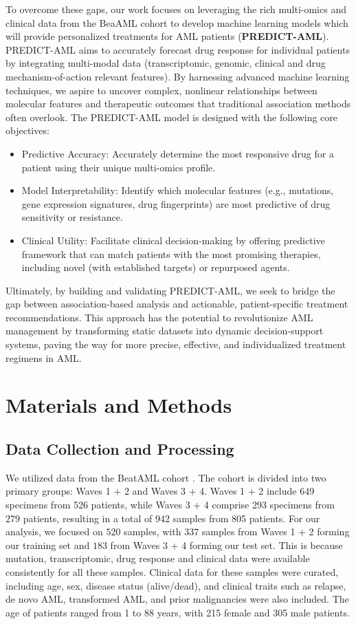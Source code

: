 \documentclass[pdflatex,sn-mathphys-num]{sn-jnl}%
\theoremstyle{thmstyleone}%
\theoremstyle{thmstyletwo}%
\theoremstyle{thmstylethree}%
\begin{document}
To overcome these gaps, our work focuses on leveraging the rich multi-omics and clinical data from the BeaAML cohort to develop machine learning models \cite{lecun2015deep} which will provide personalized treatments for AML patients (\textbf{PREDICT-AML}).
PREDICT-AML aims to accurately forecast drug response for individual patients by integrating multi-modal data (transcriptomic, genomic, clinical and drug mechanism-of-action relevant features). By harnessing advanced machine learning techniques, we aspire to uncover complex, nonlinear relationships between molecular features and therapeutic outcomes that traditional association methods often overlook. The PREDICT-AML model is designed with the following core objectives:
\begin{itemize}
    \item Predictive Accuracy: Accurately determine the most responsive drug for a patient using their unique multi-omics profile.
    \item Model Interpretability: Identify which molecular features (e.g., mutations, gene expression signatures, drug fingerprints) are most predictive of drug sensitivity or resistance.
    \item Clinical Utility: Facilitate clinical decision-making by offering predictive framework that can match patients with the most promising therapies, including novel (with established targets) or repurposed agents.
\end{itemize}

Ultimately, by building and validating PREDICT-AML, we seek to bridge the gap between association-based analysis and actionable, patient-specific treatment recommendations. This approach has the potential to revolutionize AML management by transforming static datasets into dynamic decision-support systems, paving the way for more precise, effective, and individualized treatment regimens in AML.

\section{Materials and Methods}\label{sec2}
\subsection{Data Collection and Processing} 
We utilized data from the BeatAML cohort \cite{bottomly2022integrative}. The cohort is divided into two primary groups: Waves 1 + 2 and Waves 3 + 4. Waves 1 + 2 include 649 specimens from 526 patients, while Waves 3 + 4 comprise 293 specimens from 279 patients, resulting in a total of 942 samples from 805 patients. For our analysis, we focused on $520$ samples, with $337$ samples from Waves 1 + 2 forming our training set and $183$ from Waves 3 + 4 forming our test set. This is because mutation, transcriptomic, drug response and clinical data were available consistently for all these samples. Clinical data for these samples were curated, including age, sex, disease status (alive/dead), and clinical traits such as relapse, de novo AML, transformed AML, and prior malignancies were also included. The age of patients ranged from 1 to 88 years, with 215 female and 305 male patients. 
\end{document}
